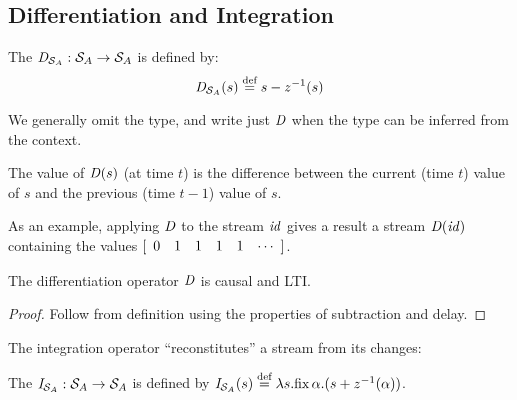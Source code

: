 \subsection{Differentiation and Integration}

\begin{definition}[Differentiation]
The  $\mathit{D}_{\mathcal{S}_{A}} : \mathcal{S}_{A} \to \mathcal{S}_{A}$ is defined by:
$$
\mathit{D}_{\mathcal{S}_{A}}(s) \stackrel{\textrm{\scriptsize def}}{=} s - z^{-1}(s)
$$ 
\end{definition}
We generally omit the type, and write just $\mathit{D}$ when the type can be inferred from the context.

The value of $\mathit{D}(s)$ (at time $t$) is the difference
between  the current (time $t$) value of $s$ and the previous (time $t-1$) value of $s$.

As an example, applying $\mathit{D}$ to the stream $\mathit{id}$ gives a result a
stream $\mathit{D}(\mathit{id})$ containing the values $\sv{0 1 1 1 1}$.

\begin{center}
\end{center}

\begin{proposition}
\label{prop-diff-properties}
The differentiation operator $\mathit{D}$ is causal and LTI.
\end{proposition}
\begin{proof}
Follow from definition using the properties of subtraction and delay.
\end{proof}

The integration operator ``reconstitutes'' a stream from its changes:

\begin{definition}[Integration]
The   $\mathit{I}_{\mathcal{S}_{A}} : \mathcal{S}_{A} \to \mathcal{S}_{A}$ 
is defined by $\mathit{I}_{\mathcal{S}_{A}}(s) \stackrel{\textrm{\scriptsize def}}{=} \lambda s . \mbox{fix}\,\alpha.(s + z^{-1}(\alpha))$.
\end{definition}

